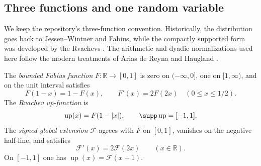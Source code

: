 \documentclass[11pt,oneside]{article}
\theoremstyle{definition}
\theoremstyle{remark}
\newcommand{\Up}{\operatorname{up}}
\newcommand{\R}{\mathbb R}
\newcommand{\1}{\mathbf 1}
\begin{document}
\subsection{Three functions and one random variable}

We keep the repository's three-function convention.  Historically, the distribution goes
back to Jessen--Wintner and Fabius, while the compactly supported form was developed by the
Rvachevs \cite{p3:jessen1935,p3:fabius1966,p3:rvachev1971,p3:rvachev1990}.  The arithmetic and dyadic
normalizations used here follow the modern treatments of Arias de Reyna and Haugland
\cite{p3:arias1982,p3:arias2018,p3:haugland2016}.

\begin{definition}
The \emph{bounded Fabius function} $F:\R\to[0,1]$ is zero on $(-\infty,0]$, one on
$[1,\infty)$, and on the unit interval satisfies
\begin{equation}
 F(1-x)=1-F(x),\qquad F'(x)=2F(2x)\quad(0\le x\le1/2).
 \label{p3:eq:F-laws}
\end{equation}
The \emph{Rvachev up-function} is
\begin{equation}
 \Up(x)=F(1-|x|),\qquad \supp\Up=[-1,1].
 \label{p3:eq:up-fold}
\end{equation}
The \emph{signed global extension} $\mathcal F$ agrees with $F$ on $[0,1]$, vanishes on the
negative half-line, and satisfies
\begin{equation}
 \mathcal F'(x)=2\mathcal F(2x)\qquad(x\in\R).
 \label{p3:eq:global-diff}
\end{equation}
On $[-1,1]$ one has $\Up(x)=\mathcal F(x+1)$.
\end{definition}
\end{document}
